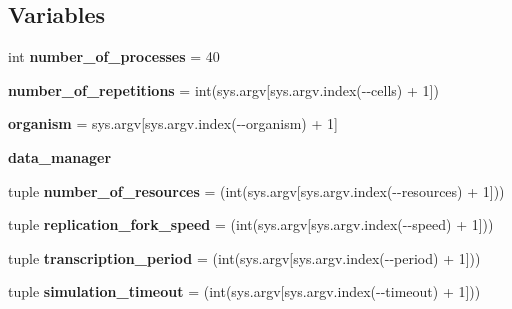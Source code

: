 \subsection*{Variables}
\begin{DoxyCompactItemize}
\item 
\mbox{\label{namespacesrc_1_1main_ad7055b851474328b07fdb15ffcc8fa6f}} 
int {\bfseries number\+\_\+of\+\_\+processes} = 40
\item 
\mbox{\label{namespacesrc_1_1main_a700532f7537efd12cb945947f22e0f1c}} 
{\bfseries number\+\_\+of\+\_\+repetitions} = int(sys.\+argv\mbox{[}sys.\+argv.\+index(\textquotesingle{}-\/-\/cells\textquotesingle{}) + 1\mbox{]})
\item 
\mbox{\label{namespacesrc_1_1main_a5fd6d2babe3089b4df469428d62272eb}} 
{\bfseries organism} = sys.\+argv\mbox{[}sys.\+argv.\+index(\textquotesingle{}-\/-\/organism\textquotesingle{}) + 1\mbox{]}
\item 
{\bfseries data\+\_\+manager}
\item 
\mbox{\label{namespacesrc_1_1main_a9a0ab683fec31970f138645bb828d289}} 
tuple {\bfseries number\+\_\+of\+\_\+resources} = (int(sys.\+argv\mbox{[}sys.\+argv.\+index(\textquotesingle{}-\/-\/resources\textquotesingle{}) + 1\mbox{]}))
\item 
\mbox{\label{namespacesrc_1_1main_a2dd950a94e374a513eac28ebf16e60c9}} 
tuple {\bfseries replication\+\_\+fork\+\_\+speed} = (int(sys.\+argv\mbox{[}sys.\+argv.\+index(\textquotesingle{}-\/-\/speed\textquotesingle{}) + 1\mbox{]}))
\item 
\mbox{\label{namespacesrc_1_1main_a3ee509430b5164e95ee66cc58d6a14ea}} 
tuple {\bfseries transcription\+\_\+period} = (int(sys.\+argv\mbox{[}sys.\+argv.\+index(\textquotesingle{}-\/-\/period\textquotesingle{}) + 1\mbox{]}))
\item 
\mbox{\label{namespacesrc_1_1main_a7d9814ffd846fb5e0ed09d19207604ce}} 
tuple {\bfseries simulation\+\_\+timeout} = (int(sys.\+argv\mbox{[}sys.\+argv.\+index(\textquotesingle{}-\/-\/timeout\textquotesingle{}) + 1\mbox{]}))
\item 

\end{DoxyCompactItemize}
